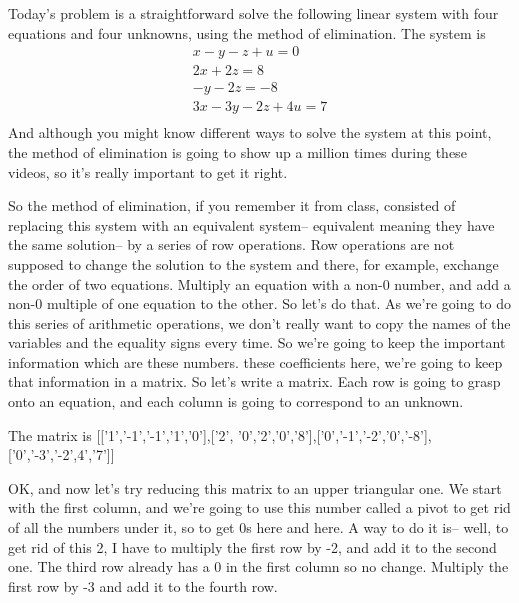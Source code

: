 \documentclass{ximera}
\begin{document}
\begin{question}
Today's problem is a straightforward solve the following linear system with four equations and four unknowns, using the method of elimination. The system is 
\begin{align*}
  x  - y -    z + u  =  0\\
2x        +2z         =  8\\
      - y  - 2z         = -8\\
3x -3y - 2z + 4u =  7\\
\end{align*}
And although you might know different ways to solve the system at this point, the method of elimination is going to show up a million times during these videos, so it's really important to get it right.
\begin{solution}
\begin{hint}
So the method of elimination, if you remember it from class, consisted of replacing this system with an equivalent system-- equivalent meaning they have the same solution-- by a series of row operations. Row operations are not supposed to change the solution to the system and there, for example, exchange the order of two equations. Multiply an equation with a non-0 number, and add a non-0 multiple of one equation to the other. So let's do that.
As we're going to do this series of arithmetic operations, we don't really want to copy the names of the variables and the equality signs every time. So we're going to keep the important information which are these numbers. these coefficients here, we're going to keep that information in a matrix.
So let's write a matrix. Each row is going to grasp onto an equation, and each column is going to correspond to an unknown.

\begin{matrixAnswer}[name=M]
      The matrix is  [['1','-1','-1','1','0'],['2', '0','2','0','8'],['0','-1','-2','0','-8'],['0','-3','-2',4','7']]
 \end{matrixAnswer}

\end{hint}
\begin{hint}
OK, and now let's try reducing this matrix to an upper triangular one. We start with the first column, and we're going to use this number called a pivot to get rid of all the numbers under it, so to get 0s here and here. A way to do it is-- well, to get rid of this 2, I have to multiply the first row by -2, and add it to the second one. The third row already has a 0 in the first column so no change. Multiply the first row by -3 and add it to the fourth row.


\end{hint}
\end{solution}
\end{question}
\end{document}
